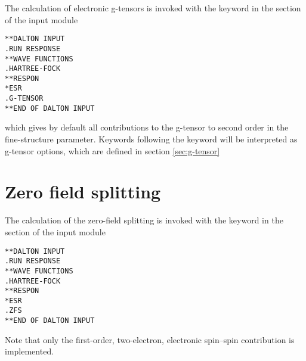 \begin{center}
\end{center}

The calculation of electronic g-tensors is invoked
with the keyword  in the
 section of the  input module

\begin{verbatim}
**DALTON INPUT
.RUN RESPONSE
**WAVE FUNCTIONS
.HARTREE-FOCK
**RESPON
*ESR
.G-TENSOR
**END OF DALTON INPUT
\end{verbatim}
which gives by default all contributions to the g-tensor to second order in
the fine-structure parameter. Keywords following the  keyword
will be interpreted as g-tensor options, which are defined in section
\ref{sec:g-tensor}

\section{Zero field splitting}

\begin{center}
\end{center}
The calculation of the zero-field splitting is invoked
with the keyword  in the
 section of the  input module
\begin{verbatim}
**DALTON INPUT
.RUN RESPONSE
**WAVE FUNCTIONS
.HARTREE-FOCK
**RESPON
*ESR
.ZFS
**END OF DALTON INPUT
\end{verbatim}
Note that only the first-order, two-electron, electronic spin--spin contribution
is implemented.

